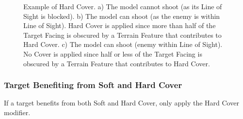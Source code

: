 \newcommand{\figureSCA}{a)}
\newcommand{\figureSCB}{b)}
\newcommand{\figureSCC}{c)}
\newcommand{\figureHCSizeGreen}{\normalfontsize{Height: Standard}}
\newcommand{\figureHCSizeBlue}{\normalfontsize{Height: Standard}}
\newcommand{\figureHCSizePurple}{\normalfontsize{Height: Standard}}
\newcommand{\figureHCNotwithinlightofsight}{%
\begin{minipage}{0.08\unitlength}\begin{center}%
\smallfontsize{Not within Line of Sight}%
\end{center}\end{minipage}%
}
\newcommand{\figureHCWithinlightofsight}{\smallfontsize{Within Line of Sight}}
\newcommand{\figureHCLessthanhalfoffootprintobscured}{%
\begin{minipage}{0.08\unitlength}\begin{center}%
\smallfontsize{Less than half of the Target Facing is obscured}%
\end{center}\end{minipage}%
}
\newcommand{\figureHCMorethanhalfoffootprintobscured}{%
\begin{minipage}{0.08\unitlength}\begin{center}%
\smallfontsize{More than half of the Target Facing is obscured}%
\end{center}\end{minipage}%
}

\begin{figure}[!htbp]
\vspace*{10pt}
\centering
\def\svgwidth{\textwidth}

\caption{Example of Hard Cover.\captionpar
a) The model cannot shoot (as its Line of Sight is blocked).\captionpar
b) The model can shoot (as the enemy is within Line of Sight). Hard Cover is applied since more than half of the Target Facing is obscured by a Terrain Feature that contributes to Hard Cover.\captionpar
c) The model can shoot (enemy within Line of Sight). No Cover is applied since half or less of the Target Facing is obscured by a Terrain Feature that contributes to Hard Cover.}
\label{figure/hard_cover}
\end{figure}

\subsubsection{Target Benefiting from Soft and Hard Cover}

If a target benefits from both Soft and Hard Cover, only apply the Hard Cover modifier.

